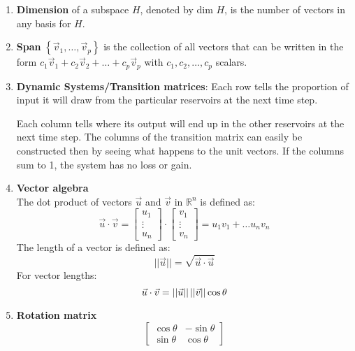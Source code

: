 \documentclass[11pt]{article}
\newcommand{\norm}[1]{\lvert #1 \rvert}
\begin{document}
\begin{enumerate}
    \item \textbf{Dimension} of a subspace $H$, denoted by dim $H$, is the number of vectors in any basis for $H$.
    
    \item \textbf{Span} $\left\{\vec{v}_1,\ldots,\vec{v}_p\right\}$ is the collection of all vectors that can be written in the form $c_1\vec{v}_1 + c_2\vec{v}_2 + \ldots + c_p\vec{v}_p$ with $c_1, c_2, \ldots, c_p$ scalars.
    
    \item \textbf{Dynamic Systems/Transition matrices}: Each row tells the proportion of input it will draw from the particular reservoirs at the next time step. 
    
    Each column tells where its output will end up in the other reservoirs at the next time step. The columns of the transition matrix can easily be constructed then by seeing what happens to the unit vectors. If the columns sum to 1, the system has no loss or gain.
    
    \item \textbf{Vector algebra} \\
    The dot product of vectors $\vec{u}$ and $\vec{v}$ in $\mathbb{R}^n$ is defined as:
    \begin{equation*}
       \vec{u}\cdot\vec{v} = \begin{bmatrix} u_1 \\ \vdots \\ u_n \end{bmatrix}
       \cdot \begin{bmatrix} v_1 \\ \vdots \\ v_n \end{bmatrix}
       = u_1v_1+\ldots u_nv_n
    \end{equation*}
    The length of a vector is defined as:
    \begin{equation*}
        \norm{\norm{\vec{u}}}=\sqrt{\vec{u}\cdot\vec{u}}
    \end{equation*}
    For vector lengths:
    \begin{equation*}
        \vec{u}\cdot\vec{v}=\norm{\norm{\vec{u}}}\hspace{.5mm}\norm{\norm{\vec{v}}}\cos{\theta}
    \end{equation*}
    
    \item \textbf{Rotation matrix}
    \begin{equation*}
        \begin{bmatrix} 
        \cos{\theta} & -\sin{\theta} \\
        \sin{\theta} & \cos{\theta}
        \end{bmatrix}
    \end{equation*}
    

\end{enumerate}
\end{document}
